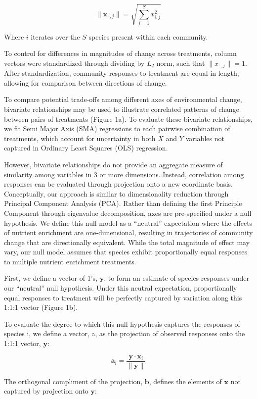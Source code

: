 \documentclass[twoside,12pt,final]{ucthesis-CA2012}
\begin{document}
\begin{ucmainmatter}
\[\|\mathbf{x}_{:,j}\| = \sqrt{\sum_{i = 1}^{S} x_{i,j}^2}\]

Where \(i\) iterates over the \(S\) species present within each community.

To control for differences in magnitudes of change across treatments, column vectors were standardized through dividing by \(L_2\) norm, such that \(\|x_{:,j}\| = 1\). After standardization, community responses to treatment are equal in length, allowing for comparison between directions of change.

To compare potential trade-offs among different axes of environmental change, bivariate relationships may be used to illustrate correlated patterns of change between pairs of treatments (Figure 1a). To evaluate these bivariate relationships, we fit Semi Major Axis (SMA) regressions to each pairwise combination of treatments, which account for uncertainty in both \(X\) and \(Y\) variables not captured in Ordinary Least Squares (OLS) regression.

However, bivariate relationships do not provide an aggregate measure of similarity among variables in 3 or more dimensions. Instead, correlation among responses can be evaluated through projection onto a new coordinate basis. Conceptually, our approach is similar to dimensionality reduction through Principal Component Analysis (PCA). Rather than defining the first Principle Component through eigenvalue decomposition, axes are pre-specified under a null hypothesis. We define this null model as a ``neutral'' expectation where the effects of nutrient enrichment are one-dimensional, resulting in trajectories of community change that are directionally equivalent. While the total magnitude of effect may vary, our null model assumes that species exhibit proportionally equal responses to multiple nutrient enrichment treatments.

First, we define a vector of 1's, \(\mathbf{y}\), to form an estimate of species responses under our ``neutral'' null hypothesis. Under this neutral expectation, proportionally equal responses to treatment will be perfectly captured by variation along this 1:1:1 vector (Figure 1b).

To evaluate the degree to which this null hypothesis captures the responses of species i, we define a vector, a, as the projection of observed responses onto the 1:1:1 vector, \(\mathbf{y}\):

\[\mathbf{a}_i = \frac{\mathbf{y} \cdot \mathbf{x}_i}{\|\mathbf{y}\|}\]

The orthogonal compliment of the projection, \(\mathbf{b}\), defines the elements of \(\mathbf{x}\) not captured by projection onto \(\mathbf{y}\):


\end{ucmainmatter}
\end{document}
